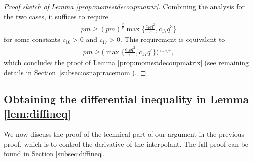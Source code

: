 \documentclass[11pt]{amsart}
\numberwithin{equation}{section}
\numberwithin{equation}{section}
\theoremstyle{remark}
\theoremstyle{definition}
\begin{document}
\begin{proof}[Proof sketch of Lemma \ref{prop:momestdecoupmatrix}]
Combining the analysis for the two cases, it suffices to require
\begin{align*}pm \ge (pm)^{\frac{2}{q}}\max\Big\{\frac{c_{16} q^{2}}{\varepsilon}, c_{17} q^3\Big\}
\end{align*}
for some constants $c_{16}>0$ and $c_{17}>0$. This requirement is equivalent to
\begin{align*}pm \ge \bigg(\max\Big\{\frac{c_{16} q^{2}}{\varepsilon}, c_{17} q^3\Big\}\bigg)^{\frac{1}{1-2/q}},
\end{align*}
which concludes the proof of Lemma \ref{prop:momestdecoupmatrix} (see remaining details in Section~\ref{subsec:osnaptracemom}).
\end{proof}

\subsection{Obtaining the differential inequality in Lemma \ref{lem:diffineq}}

We now discuss the proof of the technical part of our argument in the previous proof, which is to control the derivative of the interpolant. The full proof can be found in Section \ref{subsec:diffineq}.
\end{document}
